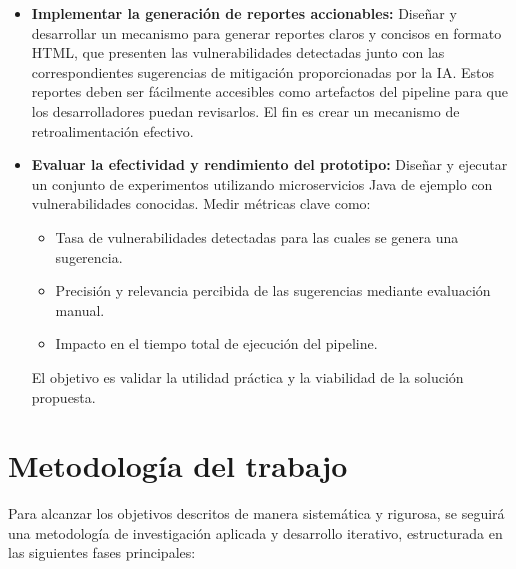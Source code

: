 \begin{itemize}
    \item \textbf{Implementar la generación de reportes accionables:} Diseñar y desarrollar un mecanismo para generar reportes claros y concisos en formato HTML, que presenten las vulnerabilidades detectadas junto con las correspondientes sugerencias de mitigación proporcionadas por la IA. Estos reportes deben ser fácilmente accesibles como artefactos del pipeline para que los desarrolladores puedan revisarlos. El fin es crear un mecanismo de retroalimentación efectivo.
    
    \item \textbf{Evaluar la efectividad y rendimiento del prototipo:} Diseñar y ejecutar un conjunto de experimentos utilizando microservicios Java de ejemplo con vulnerabilidades conocidas. Medir métricas clave como:
    \begin{itemize}
        \item Tasa de vulnerabilidades detectadas para las cuales se genera una sugerencia.
        \item Precisión y relevancia percibida de las sugerencias mediante evaluación manual.
        \item Impacto en el tiempo total de ejecución del pipeline.
    \end{itemize}
    El objetivo es validar la utilidad práctica y la viabilidad de la solución propuesta.
\end{itemize}

\section{Metodología del trabajo}\label{sec:metodologia_trabajo}

Para alcanzar los objetivos descritos de manera sistemática y rigurosa, se seguirá una metodología de investigación aplicada y desarrollo iterativo, estructurada en las siguientes fases principales:

